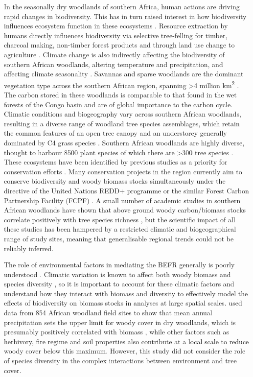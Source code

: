 \documentclass[11pt,a4paper]{article}
\begin{document}
In the seasonally dry woodlands of southern Africa, human actions are driving rapid changes in biodiversity. This has in turn raised interest in how biodiversity influences ecosystem function in these ecosystems \citep{}. Resource extraction by humans directly influences biodiversity via selective tree-felling for timber, charcoal making, non-timber forest products and through land use change to agriculture \citep{Ryan2016}. Climate change is also indirectly affecting the biodiversity of southern African woodlands, altering temperature and precipitation, and affecting climate seasonality \citep{}. Savannas and sparse woodlands are the dominant vegetation type across the southern African region, spanning >4 million km\textsuperscript{2} \citep{Ryan2016}. The carbon stored in these woodlands is comparable to that found in the wet forests of the Congo basin and are of global importance to the carbon cycle. Climatic conditions and biogeography vary across southern African woodlands, resulting in a diverse range of woodland tree species assemblages, which retain the common features of an open tree canopy and an understorey generally dominated by C4 grass species \citep{Frost1996}. Southern African woodlands are highly diverse, thought to harbour \textapprox{}8500 plant species of which there are >300 tree species \citep{Frost1996}. These ecosystems have been identified by previous studies as a priority for conservation efforts \citep{Brooks2006, Mittermeier2003, Frost1996}. Many conservation projects in the region currently aim to conserve biodiversity and woody biomass stocks simultaneously under the directive of the United Nations REDD+ programme or the similar Forest Carbon Partnership Facility (FCPF) \citep{Hinsley2015}. A small number of academic studies in southern African woodlands have shown that above ground woody carbon/biomass stocks correlate positively with tree species richness \citep{McNicol2018, and, others}, but the scientific impact of all these studies has been hampered by a restricted climatic and biogeographical range of study sites, meaning that generalisable regional trends could not be reliably inferred.  


The role of environmental factors in mediating the BEFR generally is poorly understood \citep{Ratcliffe2017}. Climatic variation is known to affect both woody biomass \citep{Michaletz2014} and species diversity \citep{}, so it is important to account for these climatic factors and understand how they interact with biomass and diversity to effectively model the effects of biodiversity on biomass stocks in analyses at large spatial scales. \citet{Sankaran2005} used data from 854 African woodland field sites to show that mean annual precipitation sets the upper limit for woody cover in dry woodlands, which is presumably positively correlated with biomass \citep{}, while other factors such as herbivory, fire regime and soil properties also contribute at a local scale to reduce woody cover below this maximum. However, this study did not consider the role of species diversity in the complex interactions between environment and tree cover. 
\end{document}
